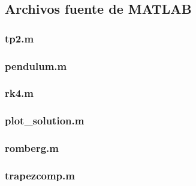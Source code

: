 \lstset{numbersep=5pt}

\lstset{inputencoding=cp1252}



\fontsize{9pt}{10pt}
\selectfont







\subsection{Archivos fuente de \textbf{MATLAB}}
\label{apendix:files}
\subsubsection{tp2.m}
\label{apendix:file_tp2}

\clearpage

\subsubsection{pendulum.m}
\label{apendix:file_pendulum}

\clearpage

\subsubsection{rk4.m}
\label{apendix:file_rk4}

\clearpage

\subsubsection{plot\_solution.m}
\label{apendix:file_pts}

\clearpage

\subsubsection{romberg.m}
\label{apendix:file_romberg}

\clearpage

\subsubsection{trapezcomp.m}
\label{apendix:file_trapezcomp}

\clearpage

\normalfont
\normalsize







